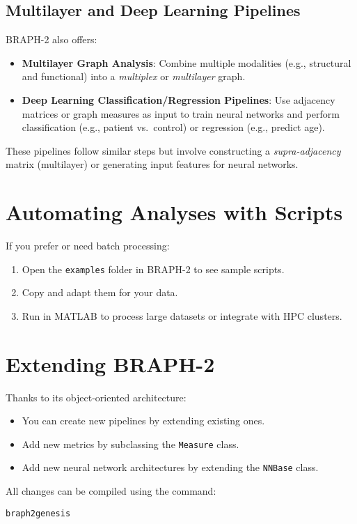 \documentclass[justified]{tufte-handout}
\begin{document}
\subsection{Multilayer and Deep Learning Pipelines}

BRAPH-2 also offers:
\begin{itemize}
    \item \textbf{Multilayer Graph Analysis}: Combine multiple modalities (e.g., structural and functional) into a \textit{multiplex} or \textit{multilayer} graph.
    \item \textbf{Deep Learning Classification/Regression Pipelines}: Use adjacency matrices or graph measures as input to train neural networks and perform classification (e.g., patient vs.\ control) or regression (e.g., predict age).
\end{itemize}
These pipelines follow similar steps but involve constructing a \textit{supra-adjacency} matrix (multilayer) or generating input features for neural networks.

\section{Automating Analyses with Scripts}

If you prefer or need batch processing:
\begin{enumerate}
    \item Open the \texttt{examples} folder in BRAPH-2 to see sample scripts.
    \item Copy and adapt them for your data.  
    \item Run in MATLAB to process large datasets or integrate with HPC clusters.
\end{enumerate}

\section{Extending BRAPH-2}

Thanks to its object-oriented architecture:
\begin{itemize}
    \item You can create new pipelines by extending existing ones.
    \item Add new metrics by subclassing the \texttt{Measure} class.
    \item Add new neural network architectures by extending the \texttt{NNBase} class.
\end{itemize}
All changes can be compiled using the command:
\begin{verbatim}
braph2genesis
\end{verbatim}
\end{document}
